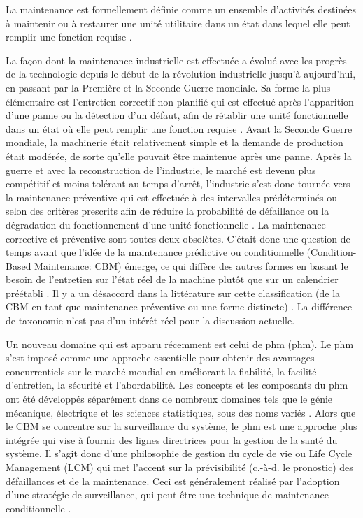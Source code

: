 La maintenance est formellement définie comme un ensemble d’activités destinées à maintenir ou à restaurer une unité utilitaire dans un état dans lequel elle peut remplir une fonction requise \cite{ISO2015}.

La façon dont la maintenance industrielle est effectuée a évolué avec les progrès de la technologie depuis le début de la révolution industrielle jusqu’à aujourd’hui, en passant par la Première et la Seconde Guerre mondiale. Sa forme la plus élémentaire est l’entretien correctif non planifié qui est effectué après l’apparition d’une panne ou la détection d’un défaut, afin de rétablir une unité fonctionnelle dans un état où elle peut remplir une fonction requise \cite{ISO2015}. Avant la Seconde Guerre mondiale, la machinerie était relativement simple et la demande de production était modérée, de sorte qu’elle pouvait être maintenue après une panne. Après la guerre et avec la reconstruction de l’industrie, le marché est devenu plus compétitif et moins tolérant au temps d’arrêt, l’industrie s’est donc tournée vers la maintenance préventive qui est effectuée à des intervalles prédéterminés ou selon des critères prescrits afin de réduire la probabilité de défaillance ou la dégradation du fonctionnement d’une unité fonctionnelle \cite{ISO2015}.  La maintenance corrective et préventive sont toutes deux obsolètes. %
C’était donc une question de temps avant que l’idée de la maintenance prédictive ou conditionnelle (Condition-Based Maintenance: CBM) émerge, ce qui diffère des autres formes en basant le besoin de l'entretien sur l’état réel de la machine plutôt que sur un calendrier préétabli \cite{Kadry2013}. Il y a un désaccord dans la littérature sur cette classification (de la CBM en tant que maintenance préventive ou une forme distincte) \cite{Shin2015}. La différence de taxonomie n’est pas d’un intérêt réel pour la discussion actuelle.

Un nouveau domaine qui est apparu récemment est celui de \acrlong{phm} (\acrshort{phm}). Le \acrshort{phm} s’est imposé comme une approche essentielle pour obtenir des avantages concurrentiels sur le marché mondial en améliorant la fiabilité, la facilité d’entretien, la sécurité et l’abordabilité. Les concepts et les composants du \acrshort{phm} ont été développés séparément dans de nombreux domaines tels que le génie mécanique, électrique et les sciences statistiques, sous des noms variés \cite{Tsui2015}. Alors que le CBM se concentre sur la surveillance du système, le \acrshort{phm} est une approche plus intégrée qui vise à fournir des lignes directrices pour la gestion de la santé du système. Il s’agit donc d’une philosophie de gestion du cycle de vie ou Life Cycle Management (LCM) qui met l’accent sur la prévisibilité (c.-à-d. le pronostic) des défaillances et de la maintenance. Ceci est généralement réalisé par l’adoption d’une stratégie de surveillance, qui peut être une technique de maintenance conditionnelle \cite{Tinga2014}.


